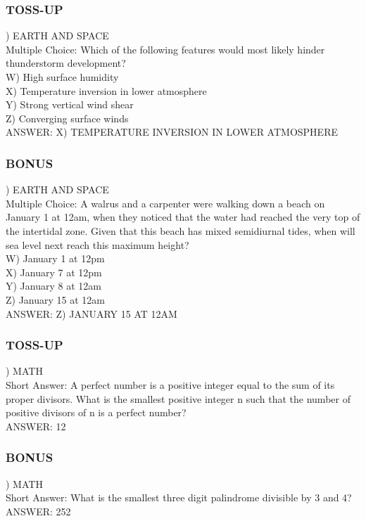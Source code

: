 \documentclass{article}
\begin{document}
\newpage

\subsubsection*{TOSS-UP}
) EARTH AND SPACE \\
Multiple Choice: Which of the following features would most likely hinder thunderstorm development? \\
W) High surface humidity \\
X) Temperature inversion in lower atmosphere \\
Y) Strong vertical wind shear \\
Z) Converging surface winds \\
ANSWER: X) TEMPERATURE INVERSION IN LOWER ATMOSPHERE

\subsubsection*{BONUS}
) EARTH AND SPACE \\
Multiple Choice: A walrus and a carpenter were walking down a beach on January 1 at 12am, when they noticed that the water had reached the very top of the intertidal zone. Given that this beach has mixed semidiurnal tides, when will sea level next reach this maximum height? \\
W) January 1 at 12pm \\
X) January 7 at 12pm \\
Y) January 8 at 12am \\
Z) January 15 at 12am \\
ANSWER: Z) JANUARY 15 AT 12AM

\subsubsection*{TOSS-UP}
) MATH \\
Short Answer: A perfect number is a positive integer equal to the sum of its proper divisors. What is the smallest positive integer n such that the number of positive divisors of n is a perfect number? \\
ANSWER: 12

\subsubsection*{BONUS}
) MATH \\
Short Answer: What is the smallest three digit palindrome divisible by 3 and 4? \\
ANSWER: 252
\end{document}
